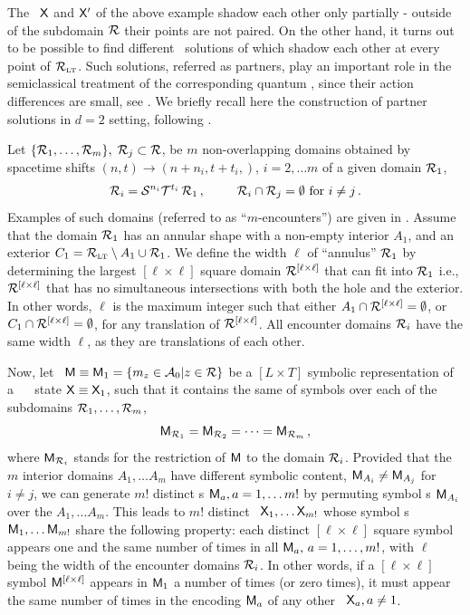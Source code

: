 \documentclass[12pt]{iopart}
\begin{document}
The \twots\ $\mathsf{X}$ and $\mathsf{X}'$ of the above example shadow each other only
partially - outside of the subdomain $\mathcal{R}$ their points are not paired. On the
other hand, it turns out to be possible to find different \twots\
solutions of  which shadow each other at every point
of $\mathcal{R}_{\scriptscriptstyle\mathrm{LT}}$. Such solutions, referred as partners,  play an important role
in the semiclassical treatment of the corresponding quantum , since
their action differences are small, see
. We briefly
recall here the construction of partner solutions in  $d=2$ setting,
following \refref{GutOsi15}.

Let $\{\mathcal{R}_1, \dots, \mathcal{R}_{m}\},\; \mathcal{R}_j\subset \mathcal{R}$, be ${m}$ non-overlapping
domains obtained  by spacetime shifts $(n,t)\to(n+n_i,t+t_i,)$,
$i=2,\dots {m}$ of a given domain $\mathcal{R}_1$,
\[
\mathcal{R}_i=\mathcal{S}^{n_i}\mathcal{T}^{t_i}\,\mathcal{R}_1
\,,\hspace*{25pt}
\mathcal{R}_i\cap\mathcal{R}_j=\emptyset \mbox{ for } i\neq j
\,.
\]
Examples of such domains (referred to as ``${m}$-encounters'')
are given in . Assume
that the domain $\mathcal{R}_1$  has  an annular shape  with a non-empty interior
$A_1$, and an exterior $C_1=\mathcal{R}_{\scriptscriptstyle\mathrm{LT}} \setminus{A}_1\cup\mathcal{R}_1$. We define the
width  $\ell$ of ``annulus'' $\mathcal{R}_1$   by determining the largest
$[\ell\!\times\!\ell]$ square domain $\mathcal{R}^{[\ell\times\ell]}$ that can fit
into $\mathcal{R}_1$ i.e., $\mathcal{R}^{[\ell\times\ell]}$ that has no simultaneous
intersections with both the hole and the exterior. In other words, $\ell$
is the maximum integer such that either
$A_1\cap\mathcal{R}^{[\ell\times \ell]}=\emptyset$, or
$C_1\cap\mathcal{R}^{[\ell\times \ell]}=\emptyset$,
for any translation of $\mathcal{R}^{[\ell\times \ell]}$. All encounter domains
$\mathcal{R}_i$ have the same width $\ell$, as they are translations of each
other.

Now,  let \brick\
\(
\mathsf{M}\equiv\mathsf{M}_1=\{{m_{z}}\in\mathcal{A}_0|z\in\mathcal{R}\}
\)
be a  $[L\!\times\!T]$ symbolic representation of a \catlatt\
 \twot\ state $\mathsf{X}\equiv\mathsf{X}_1$, such that it contains the same
{\brick} of symbols over each of the   subdomains
$\mathcal{R}_1,\dots,\mathcal{R}_{m}$,
\[
\mathsf{M}_{\mathcal{R}_1}=\mathsf{M}_{\mathcal{R}_2}= \dots = \mathsf{M}_{\mathcal{R}_{m}}
\,,
\]
where $\mathsf{M}_{\mathcal{R}_i}$ stands for the restriction of $\mathsf{M}$ to the domain
$\mathcal{R}_i$. Provided that the $m$  interior domains $A_1,\dots A_m$ have
different symbolic content, $\mathsf{M}_{A_i}\neq\mathsf{M}_{A_j}$ for $i\neq{j}$, we
can generate $m!$ distinct {\brick s} $\mathsf{M}_a, a=1,\dots m!$ by permuting
symbol \brick s $\mathsf{M}_{A_i}$ over the \edit{domains} $A_1,\dots A_m$. This leads to
${m}!$ distinct \twots\
$\mathsf{X}_1, \dots \mathsf{X}_{{m}!}$
whose symbol {\brick s} $\mathsf{M}_{1}, \dots \mathsf{M}_{{m}!}$ share the following
property: each distinct $[\ell\!\times\!\ell]$ square symbol {\brick}
appears one and the same number of times in all $\mathsf{M}_{a}, \, a=1,\dots,
m!$, with  $\ell$ being  the width of the encounter domains $\mathcal{R}_i$. In
other words, if a   $[\ell\!\times\!\ell]$ symbol {\brick}
$\mathsf{M}^{[\ell\times\ell]}$
appears in $\mathsf{M}_1$ a number of times (or zero times),  it must appear the
same number of times in  the encoding $\mathsf{M}_{a}$ of any other \twot\
$\mathsf{X}_a, a\neq1$.
\end{document}
